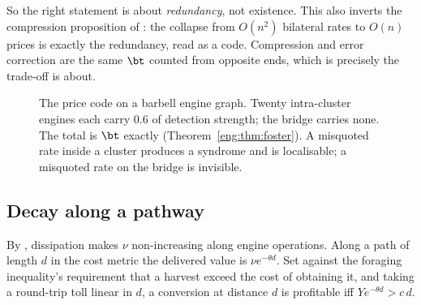 So the right statement is about \emph{redundancy}, not existence. This also
inverts the compression proposition of \cite[\S5]{vtok}: the collapse from
$O(n^2)$ bilateral rates to $O(n)$ prices is exactly the redundancy, read
as a code. Compression and error correction are the same $\bt$ counted from
opposite ends, which is precisely the trade-off \cite{compaut} is about.

\begin{figure}[t]
\centering
{}
\caption{The price code on a barbell engine graph. Twenty intra-cluster
engines each carry $0.6$ of detection strength; the bridge carries none.
The total is $\bt$ exactly (Theorem~\ref{eng:thm:foster}). A misquoted rate
inside a cluster produces a syndrome and is localisable; a misquoted rate
on the bridge is invisible.}
\label{eng:fig:barbell}
\end{figure}

\subsection{Decay along a pathway}\label{eng:S6.4}
\label{eng:sec:decay}

By \cite[Prop.~6.1]{vtok}, dissipation makes $\nu$ non-increasing along
engine operations. Along a path of length $d$ in the cost metric the
delivered value is $\nu e^{-\theta d}$. Set against the foraging
inequality's requirement that a harvest exceed the cost of obtaining it,
and taking a round-trip toll linear in $d$, a conversion at distance $d$ is
profitable iff $Y e^{-\theta d} > c\,d$.

